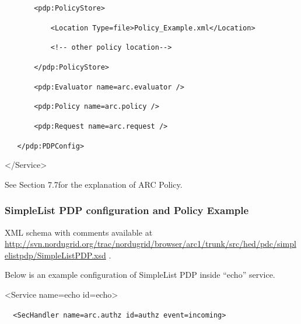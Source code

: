\documentclass{article}
\begin{document}
{\upshape\color{black}
\texttt{\ \ \ \ \ \ \ {\textless}pdp:PolicyStore{\textgreater}}}

{\upshape\color{black}
\texttt{\ \ \ \ \ \ \ \ \ \ \ {\textless}Location
Type={\textquotedbl}file{\textquotedbl}{\textgreater}Policy\_Example.xml{\textless}/Location{\textgreater}}}

{\upshape\color{black}
\texttt{\ \ \ \ \ \ \ \ \ \ \ {\textless}!-{}- other policy
location-{}-{\textgreater}}}

{\upshape\color{black}
\texttt{\ \ \ \ \ \ \ {\textless}/pdp:PolicyStore{\textgreater}}}

{\upshape\color{black}
\texttt{\ \ \ \ \ \ \ {\textless}pdp:Evaluator
name={\textquotedbl}arc.evaluator{\textquotedbl} /{\textgreater}}}

{\upshape\color{black}
\texttt{\ \ \ \ \ \ \ {\textless}pdp:Policy
name={\textquotedbl}arc.policy{\textquotedbl} /{\textgreater}}}

{\upshape\color{black}
\texttt{\ \ \ \ \ \ \ {\textless}pdp:Request
name={\textquotedbl}arc.request{\textquotedbl} /{\textgreater}}}

{\upshape\color{black}
\texttt{\ \ \ {\textless}/pdp:PDPConfig{\textgreater}}}

{\ttfamily\color{black}
{\textless}/Service{\textgreater}}

{\upshape\color{black}
See Section 7.7for the explanation of ARC Policy.}

\subsubsection{SimpleList PDP configuration and Policy Example}
{\upshape\color{black}
XML schema with comments available at
\url{http://svn.nordugrid.org/trac/nordugrid/browser/arc1/trunk/src/hed/pdc/simplelistpdp/SimpleListPDP.xsd}
.}

{\upshape\color{black}
Below is an example configuration of SimpleList PDP inside
{\textquotedblleft}echo{\textquotedblright} service.}

{\ttfamily\color{black}
{\textless}Service name={\textquotedbl}echo{\textquotedbl}
id={\textquotedbl}echo{\textquotedbl}{\textgreater}}

{\upshape\color{black}
\foreignlanguage{spanish}{\texttt{\ \ }}\texttt{{\textless}SecHandler
name={\textquotedbl}arc.authz{\textquotedbl}
id={\textquotedbl}authz{\textquotedbl}
event={\textquotedbl}incoming{\textquotedbl}{\textgreater}}}
\end{document}
